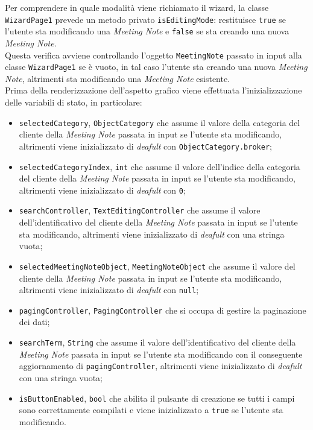 Per comprendere in quale modalità viene richiamato il \gls{wizard}\glsoccur, la classe \lstinline{WizardPage1} prevede un metodo privato \lstinline{isEditingMode}: restituisce \lstinline{true} se l'utente sta modificando una \emph{Meeting Note} e \lstinline{false} se sta creando una nuova \emph{Meeting Note}. \\
Questa verifica avviene controllando l'oggetto \lstinline{MeetingNote} passato in input alla classe \lstinline{WizardPage1} se è vuoto, in tal caso l'utente sta creando una nuova \emph{Meeting Note}, altrimenti sta modificando una \emph{Meeting Note} esistente. \\
Prima della renderizzazione dell'aspetto grafico viene effettuata l'inizializzazione delle variabili di stato, in particolare:
\begin{itemize}
    \item \lstinline{selectedCategory}, \lstinline{ObjectCategory} che assume il valore della categoria del cliente della \emph{Meeting Note} passata in input se l'utente sta modificando, altrimenti viene inizializzato di \emph{deafult} con \lstinline{ObjectCategory.broker};
    \item \lstinline{selectedCategoryIndex}, \lstinline{int} che assume il valore dell'indice della categoria del cliente della \emph{Meeting Note} passata in input se l'utente sta modificando, altrimenti viene inizializzato di \emph{deafult} con \lstinline{0};
    \item \lstinline{searchController}, \lstinline{TextEditingController} che assume il valore dell'identificativo del cliente della \emph{Meeting Note} passata in input se l'utente sta modificando, altrimenti viene inizializzato di \emph{deafult} con una stringa vuota;
    \item \lstinline{selectedMeetingNoteObject}, \lstinline{MeetingNoteObject} che assume il valore del cliente della \emph{Meeting Note} passata in input se l'utente sta modificando, altrimenti viene inizializzato di \emph{deafult} con \lstinline{null};
    \item \lstinline{pagingController}, \lstinline{PagingController} che si occupa di gestire la paginazione dei dati;
    \item \lstinline{searchTerm}, \lstinline{String} che assume il valore dell'identificativo del cliente della \emph{Meeting Note} passata in input se l'utente sta modificando con il conseguente aggiornamento di \lstinline{pagingController}, altrimenti viene inizializzato di \emph{deafult} con una stringa vuota;
    \item \lstinline{isButtonEnabled}, \lstinline{bool} che abilita il pulsante di creazione se tutti i campi sono correttamente compilati e viene inizializzato a \lstinline{true} se l'utente sta modificando.
\end{itemize}
